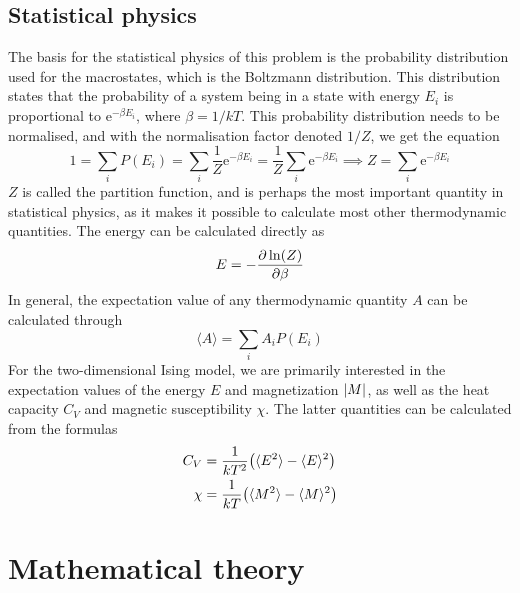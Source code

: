 \documentclass[12pt,english,a4paper]{article}
\renewcommand{\exp}[1]{\mathrm{e}^{#1}}
\begin{document}
\subsection{Statistical physics}
The basis for the statistical physics of this problem is the probability distribution used for the macrostates, which is the Boltzmann distribution. This distribution states that the probability of a system being in a state with energy \(E_i\) is proportional to \(\exp{-\beta E_i}\), where \(\beta=1/kT\). This probability distribution needs to be normalised, and with the normalisation factor denoted \(1/Z\), we get the equation
\[
1 = \sum_i P(E_i) = \sum_i \frac{1}{Z}\exp{-\beta E_i} = \frac{1}{Z}\sum_i\exp{-\beta E_i} \implies Z = \sum_i \exp{-\beta E_i}
\]
\(Z\) is called the partition function, and is perhaps the most important quantity in statistical physics, as it makes it possible to calculate most other thermodynamic quantities. The energy can be calculated directly as
\[
E = -\pdv{\ln(Z)}{\beta}
\]
In general, the expectation value of any thermodynamic quantity \(A\) can be calculated through
\[
\langle A\rangle = \sum_i A_iP(E_i)
\]
For the two-dimensional Ising model, we are primarily interested in the expectation values of the energy \(E\) and magnetization \(\abs{M}\), as well as the heat capacity \(C_V\) and magnetic susceptibility \(\chi\). The latter quantities can be calculated from the formulas\autocite{compphys}
\begin{alignat*}{2}
C_V &= \frac{1}{kT^2}\qty(\langle E^2\rangle - \langle E\rangle^2)\\
\chi &= \frac{1}{kT}\qty(\langle M^2\rangle - \langle M\rangle^2)
\end{alignat*}


\section{Mathematical theory}


\end{document}
